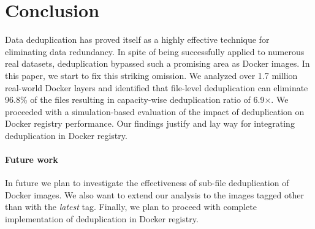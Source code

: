 \section{Conclusion}
\label{sec:conclusion}

Data deduplication has proved itself as a highly effective technique for
eliminating data redundancy.
%
In spite of being successfully applied to numerous real datasets, deduplication
bypassed such a promising area as Docker images.
%
In this paper, we start to fix this striking omission.
%
We analyzed over 1.7 million real-world Docker layers and identified that
file-level deduplication can eliminate 96.8\% of the files resulting in
capacity-wise deduplication ratio of 6.9$\times$.
%
We proceeded with a simulation-based evaluation of the impact of deduplication
on Docker registry performance.
%
%
Our findings justify and lay way for integrating deduplication in Docker
registry.

\paragraph{Future work}
%
In future we plan to investigate the effectiveness of sub-file deduplication of
Docker images.
%
We also want to extend our analysis to the images tagged other than with the
\emph{latest} tag.
%
Finally, we plan to proceed with complete implementation of deduplication in
Docker registry.

